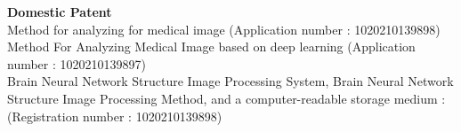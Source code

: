 \documentclass[letterpaper,10pt]{article}
\makeatletter
\newcommand{\resumeItem}[1]{
  \item\small{
    {#1 \vspace{-2pt}}
  }
}
\newcommand{\resumeProjectHeading}[2]{
    \item
    \begin{tabular*}{1.001\textwidth}{l@{\extracolsep{\fill}}r}
      \small#1 & \textbf{\small #2}\\
    \end{tabular*}\vspace{-7pt}
}
\newcommand{\resumeItemListStart}{\begin{itemize}}
\newcommand{\resumeItemListEnd}{\end{itemize}\vspace{-5pt}}
\makeatother
\begin{document}
    \begin{itemize}[leftmargin=0in, label={}]
    \small{\item{
     \textbf{Domestic Patent}\\Method for analyzing for medical image (Application number : 1020210139898)\\Method For Analyzing Medical Image based on deep learning (Application number : 1020210139897)\\Brain Neural Network Structure Image Processing System, Brain Neural Network Structure Image Processing Method, and a computer-readable storage medium : (Registration number : 1020210139898)}}
    \end{itemize}
    
\end{document}
